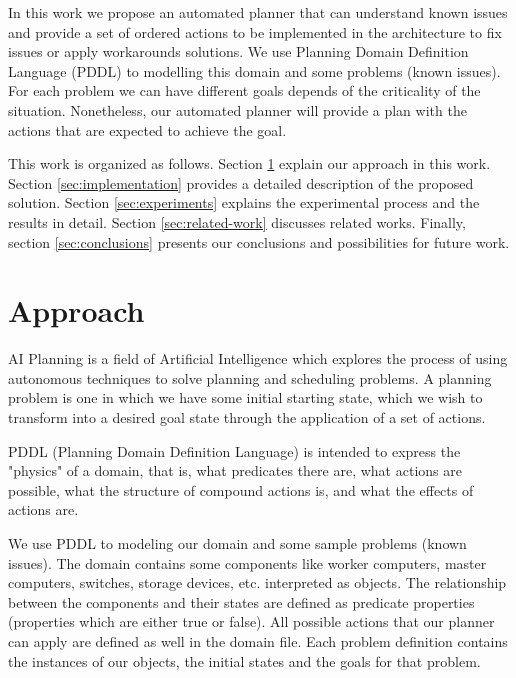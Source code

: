 \documentclass[letterpaper]{article}
\begin{document}
In this work we propose an automated planner that can understand known issues and provide a set of ordered actions to be implemented in the architecture to fix issues or apply workarounds solutions. We use Planning Domain Definition Language (PDDL) to modelling this domain and some problems (known issues). For each problem we can have different goals depends of the criticality of the situation. Nonetheless, our automated planner will provide a plan with the actions that are expected to achieve the goal.

This work is organized as follows. Section \ref{sec:approach} explain our approach in this work. Section \ref{sec:implementation} provides a detailed description of the proposed solution. Section \ref{sec:experiments} explains the experimental process and the results in detail. Section \ref{sec:related-work} discusses related works. Finally, section \ref{sec:conclusions} presents our conclusions and possibilities for future work.

\section{Approach}\label{sec:approach}

AI Planning is a field of Artificial Intelligence which explores the process of using autonomous techniques to solve planning and scheduling problems. A planning problem is one in which we have some initial starting state, which we wish to transform into a desired goal state through the application of a set of actions.

PDDL (Planning Domain Definition Language) is intended to express the "physics" of a domain, that is, what predicates there are, what actions are possible, what the structure of compound actions is, and what the effects of actions are.\cite{ghallab1998pddl}

We use PDDL to modeling our domain and some sample problems (known issues). The domain contains some components like worker computers, master computers, switches, storage devices, etc. interpreted as objects. The relationship between the components and their states are defined as predicate properties (properties which are either true or false). All possible actions that our planner can apply are defined as well in the domain file. Each problem definition contains the instances of our objects, the initial states and the goals for that problem. 
\end{document}

